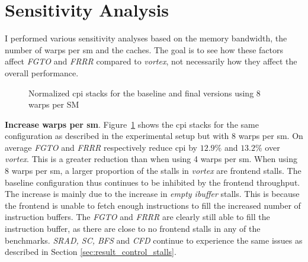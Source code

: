 \section{Sensitivity Analysis}

I performed various sensitivity analyses based on the memory bandwidth, the number of warps per \acrshort{sm} and the caches. The goal is to see how these factors affect \textit{FGTO} and \textit{FRRR} compared to \textit{\Gls{vortex}}, not necessarily how they affect the overall performance.

\begin{figure}
    \centering
    \caption[Normalized \acrshort{cpi} stacks when using 8 warps per \acrshort{sm}.]{Normalized \acrshort{cpi} stacks for the baseline and final versions using 8 warps per SM}
    \label{fig:norm_cpi_8w}
\end{figure}

\vspace{1mm}\noindent
\textbf{Increase warps per \acrshort{sm}}. Figure~\ref{fig:norm_cpi_8w} shows the \acrshort{cpi} stacks for the same configuration as described in the experimental setup but with 8 warps per \acrshort{sm}. On average \textit{FGTO} and \textit{FRRR} respectively reduce \acrshort{cpi} by $12.9\%$ and $13.2\%$ over \textit{\Gls{vortex}}. This is a greater reduction than when using 4 warps per \acrshort{sm}. When using 8 warps per \acrshort{sm}, a larger proportion of the stalls in \textit{\Gls{vortex}} are frontend stalls. The baseline configuration thus continues to be inhibited by the frontend throughput. The increase is mainly due to the increase in \textit{empty ibuffer} stalls. This is because the frontend is unable to fetch enough instructions to fill the increased number of instruction buffers. The \textit{FGTO} and \textit{FRRR} are clearly still able to fill the instruction buffer, as there are close to no frontend stalls in any of the benchmarks. \textit{SRAD, SC, BFS} and \textit{CFD} continue to experience the same issues as described in Section \ref{sec:result_control_stalls}. 

